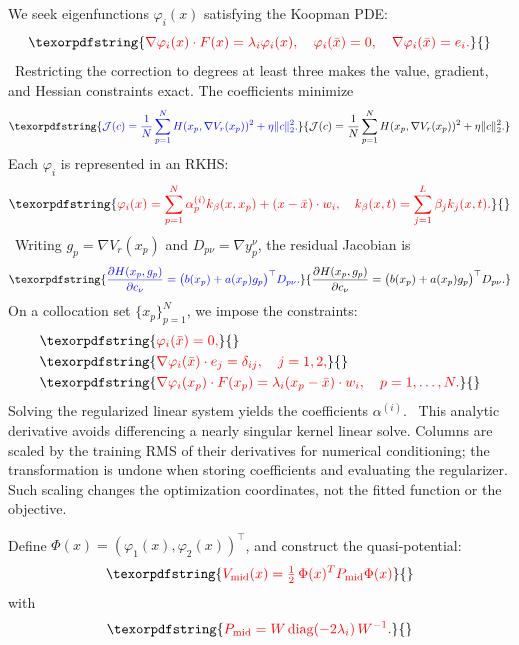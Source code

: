 \documentclass[11pt]{article}
\theoremstyle{plain}      %
\theoremstyle{definition} %
\providecommand{\DIFaddtex}[1]{{\protect\color{blue}#1}} %
\providecommand{\DIFdeltex}[1]{{\protect\color{red}#1}} %
\providecommand{\DIFaddbegin}{} %
\providecommand{\DIFaddend}{} %
\providecommand{\DIFdelbegin}{} %
\providecommand{\DIFdelend}{} %
\providecommand{\DIFadd}[1]{\texorpdfstring{\DIFaddtex{#1}}{#1}} %
\providecommand{\DIFdel}[1]{\texorpdfstring{\DIFdeltex{#1}}{}} %
\newcommand{\DIFscaledelfig}{1.0}
\newlength{\DIFdelgraphicswidth} %
\newlength{\DIFdelgraphicsheight} %
\newcommand{\DIFaddincludegraphics}[2][]{{\color{blue}\fbox{\DIFOincludegraphics[#1]{#2}}}} %
\newcommand{\DIFdelincludegraphics}[2][]{%
\sbox{\DIFdelgraphicsbox}{\DIFOincludegraphics[#1]{#2}}%
\settoboxwidth{\DIFdelgraphicswidth}{\DIFdelgraphicsbox} %
\settoboxtotalheight{\DIFdelgraphicsheight}{\DIFdelgraphicsbox} %
\scalebox{\DIFscaledelfig}{%
\parbox[b]{\DIFdelgraphicswidth}{\usebox{\DIFdelgraphicsbox}\\[-\baselineskip] \rule{\DIFdelgraphicswidth}{0em}}\llap{\resizebox{\DIFdelgraphicswidth}{\DIFdelgraphicsheight}{%
\setlength{\unitlength}{\DIFdelgraphicswidth}%
\begin{picture}(1,1)%
\thicklines\linethickness{2pt} %
{\color[rgb]{1,0,0}\put(0,0){\framebox(1,1){}}}%
{\color[rgb]{1,0,0}\put(0,0){\line( 1,1){1}}}%
{\color[rgb]{1,0,0}\put(0,1){\line(1,-1){1}}}%
\end{picture}%
}\hspace*{3pt}}} %
} %
\DeclareRobustCommand{\DIFaddbegin}{\DIFOaddbegin \let\includegraphics\DIFaddincludegraphics} %
\DeclareRobustCommand{\DIFaddend}{\DIFOaddend \let\includegraphics\DIFOincludegraphics} %
\DeclareRobustCommand{\DIFdelbegin}{\DIFOdelbegin \let\includegraphics\DIFdelincludegraphics} %
\DeclareRobustCommand{\DIFdelend}{\DIFOaddend \let\includegraphics\DIFOincludegraphics} %
\begin{document}
\DIFdelbegin \DIFdel{We seek eigenfunctions \( \varphi_i(x) \) satisfying the Koopman PDE:
}\[
\DIFdel{\nabla\varphi_i(x) \cdot F(x) = \lambda_i \varphi_i(x), \quad
\varphi_i(\bar{x}) = 0, \quad \nabla\varphi_i(\bar{x}) = e_i.
}\]%
\DIFdelend\ \DIFaddbegin \DIFadd{Restricting the correction to degrees at least three makes the value, gradient, and Hessian constraints exact. The coefficients minimize
}\begin{equation}\DIFadd{\label{eq:direct-objective}
 \mathcal J(c)=\frac{1}N\sum_{p=1}^N
 H(x_p,\nabla V_r(x_p))^2+\eta\|c\|_2^2.
}\end{equation}\DIFaddend 
\DIFdelbegin \DIFdel{Each \( \varphi_i \) is represented in an RKHS:
}\[
\DIFdel{\varphi_i(x)
= \sum_{p=1}^N \alpha^{(i)}_p k_\beta(x,x_p) + (x - \bar{x}) \cdot w_i,
\quad
k_\beta(x,t) = \sum_{j=1}^L \beta_j k_j(x,t).
}\]%
\DIFdelend\ \DIFaddbegin \DIFadd{Writing $g_p=\nabla V_r(x_p)$ and $D_{p\nu}=\nabla y_p^\nu$, the residual Jacobian is
}\[
 \DIFadd{\frac{\partial H(x_p,g_p)}{\partial c_\nu}
 =\bigl(b(x_p)+a(x_p)g_p\bigr)^\top D_{p\nu}.
}\]\DIFaddend 
\DIFdelbegin \DIFdel{On a collocation set \( \{x_p\}_{p=1}^N \), we impose the constraints:
}\begin{align*}
&\DIFdel{\varphi_i(\bar{x}) = 0, }\\
&\DIFdel{\nabla\varphi_i(\bar{x}) \cdot e_j = \delta_{ij}, \quad j=1,2, }\\
&\DIFdel{\nabla\varphi_i(x_p) \cdot F(x_p) = \lambda_i (x_p - \bar{x}) \cdot w_i, \quad p = 1, \dots, N.
}\end{align*}%
\DIFdel{Solving the regularized linear system yields the coefficients \( \alpha^{(i)} \). }\DIFdelend\ \DIFaddbegin \DIFadd{This analytic derivative avoids differencing a nearly singular kernel linear solve. Columns are scaled by the training RMS of their derivatives for numerical conditioning; the transformation is undone when storing coefficients and evaluating the regularizer. Such scaling changes the optimization coordinates, not the fitted function or the objective.
}\DIFaddend 

\DIFdelbegin \DIFdel{Define \( \Phi(x) = (\varphi_1(x), \varphi_2(x))^\top \), and construct the quasi-potential:
}\[
\DIFdel{V_{\rm mid}(x) = \tfrac12\,\Phi(x)^T P_{\rm mid} \Phi(x)
}\]%
\DIFdel{with
}\[
\DIFdel{P_{\rm mid} = W\,\mathrm{diag}(-2\lambda_i)\,W^{-1}.
}\]%
\end{document}
